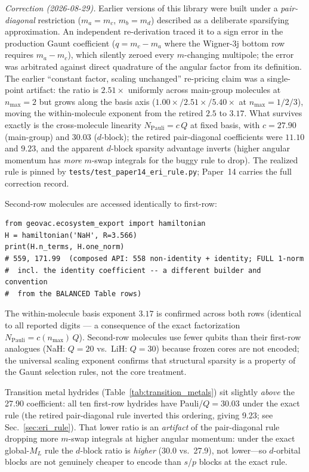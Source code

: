 \documentclass[twocolumn,pra,amsmath,amssymb,superscriptaddress]{revtex4-2}
\newcommand{\gvq}[2]{#2}
\begin{document}
\emph{Correction (2026-08-29).}  Earlier versions of this library were
built under a \emph{pair-diagonal} restriction ($m_a = m_c$,
$m_b = m_d$) described as a deliberate sparsifying approximation.  An
independent re-derivation traced it to a sign error in the production
Gaunt coefficient ($q = m_c - m_a$ where the Wigner-3j bottom row
requires $m_a - m_c$), which silently zeroed every $m$-changing
multipole; the error was arbitrated against direct quadrature of the
angular factor from its definition.  The earlier ``constant factor,
scaling unchanged'' re-pricing claim was a single-point artifact: the
ratio is $2.51\times$ uniformly across main-group molecules at
$n_{\max} = 2$ but grows along the basis axis
($1.00\times/2.51\times/5.40\times$ at $n_{\max} = 1/2/3$), moving the
within-molecule exponent from the retired $2.5$ to $3.17$.  What
survives exactly is the cross-molecule linearity
$N_{\mathrm{Pauli}} = c\,Q$ at fixed basis, with $c = \gvq{composed_coeff}{27.90}$
(main-group) and $30.03$ ($d$-block); the retired pair-diagonal
coefficients were $11.10$ and $9.23$, and the apparent $d$-block
sparsity advantage inverts (higher angular momentum has \emph{more}
$m$-swap integrals for the buggy rule to drop).  The realized rule is
pinned by \texttt{tests/test\_paper14\_eri\_rule.py}; Paper~14 carries
the full correction record.

Second-row molecules are accessed identically to first-row:
\begin{lstlisting}
from geovac.ecosystem_export import hamiltonian
H = hamiltonian('NaH', R=3.566)
print(H.n_terms, H.one_norm)
# 559, 171.99  (composed API: 558 non-identity + identity; FULL 1-norm
#  incl. the identity coefficient -- a different builder and convention
#  from the BALANCED Table rows)
\end{lstlisting}

\noindent The within-molecule basis exponent $3.17$ is confirmed across both
rows (identical to all reported digits --- a consequence of the exact
factorization $N_{\mathrm{Pauli}} = c(n_{\max})\,Q$).  Second-row molecules use fewer qubits than their first-row
analogues (NaH: $Q=20$ vs.\ LiH: $Q=30$) because frozen cores are
not encoded; the universal scaling exponent confirms that structural
sparsity is a property of the Gaunt selection rules, not the core
treatment.

Transition metal hydrides (Table~\ref{tab:transition_metals}) sit
slightly \emph{above} the \gvq{composed_coeff}{27.90} coefficient: all ten first-row hydrides have
Pauli/$Q = \gvq{composed_coeff_d}{30.03}$ under the exact rule (the retired pair-diagonal rule
inverted this ordering, giving 9.23; see Sec.~\ref{sec:eri_rule}).
That lower ratio is an \emph{artifact} of the
pair-diagonal rule dropping more $m$-swap integrals at higher angular
momentum: under the exact global-$M_L$ rule the $d$-block ratio is
\emph{higher} (30.0 vs.\ 27.9), not lower---so $d$-orbital blocks are not
genuinely cheaper to encode than $s$/$p$ blocks at the exact rule.
\end{document}
